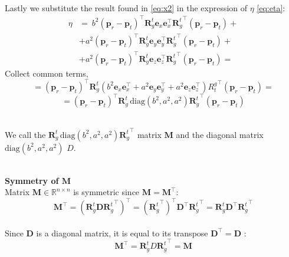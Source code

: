 \documentclass[main]{subfiles}
\begin{document}
\noindent\\
Lastly we substitute the result found in \ref{eq:x2} in the expression of $\eta$ \eqref{eq:eta}:
\[
\begin{aligned}
    \eta &=  \ b^2 \left(\mathbf{p}_r - \mathbf{p}_t\right)^\top \mathbf{R}_g^t \mathbf{e}_x \mathbf{e}_x^\top {\mathbf{R}_g^t}^\top \left(\mathbf{p}_r - \mathbf{p}_t\right) + \\
    &+ a^2 \left(\mathbf{p}_r - \mathbf{p}_t\right)^\top \mathbf{R}_g^t \mathbf{e}_y \mathbf{e}_y^\top {\mathbf{R}_g^t}^\top \left(\mathbf{p}_r - \mathbf{p}_t\right) +\\
    &+ a^2 \left(\mathbf{p}_r - \mathbf{p}_t\right)^\top \mathbf{R}_g^t \mathbf{e}_z \mathbf{e}_z^\top {\mathbf{R}_g^t}^\top \left(\mathbf{p}_r - \mathbf{p}_t\right) =
\end{aligned}
\]
Collect common terms,
\[
= \left(\mathbf{p}_r - \mathbf{p}_t\right)^\top \mathbf{R}_g^t \left( b^2 \mathbf{e}_x \mathbf{e}_x^\top + a^2 \mathbf{e}_y \mathbf{e}_y^\top + a^2 \mathbf{e}_z \mathbf{e}_z^\top \right) {R_t^g}^\top \left(\mathbf{p}_r - \mathbf{p}_t\right)=
\]
\begin{equation}
    = \left(\mathbf{p}_r - \mathbf{p}_t\right)^\top \mathbf{R}_g^t \, \text{diag}(b^2, a^2, a^2) {\mathbf{R}_g^t}^\top \left(\mathbf{p}_r - \mathbf{p}_t\right)
    \label{eq:eta2}
\end{equation}

\noindent\\
We call the \( \mathbf{R}_g^t \, \text{diag}(b^2, a^2, a^2) {\mathbf{R}_g^t}^\top \) matrix $\mathbf{M}$ and the diagonal matrix $\text{diag}(b^2, a^2, a^2)$ $D$.

\noindent\\
\textbf{Symmetry of \( \mathbf{M} \)}\noindent\\
Matrix \( \mathbf{M} \in \mathbb{R}^{n \times n} \) is symmetric since \( \mathbf{M} = \mathbf{M}^\top \):
\[
 \mathbf{M}^\top = \left( \mathbf{R}_g^t \mathbf{D} {\mathbf{R}_g^t}^\top \right)^\top = \left( {\mathbf{R}_g^t}^\top \right)^\top \mathbf{D}^\top {\mathbf{R}_g^t}^\top = \mathbf{R}_g^t \mathbf{D}^\top {\mathbf{R}_g^t}^\top
\]
\noindent\\
Since \( \mathbf{D} \) is a diagonal matrix, it is equal to its transpose $\mathbf{D}^\top = \mathbf{D}$ :
$$
 \mathbf{M}^\top =  \mathbf{R}_g^t D {\mathbf{R}_g^t}^\top = \mathbf{M}
$$
\end{document}
